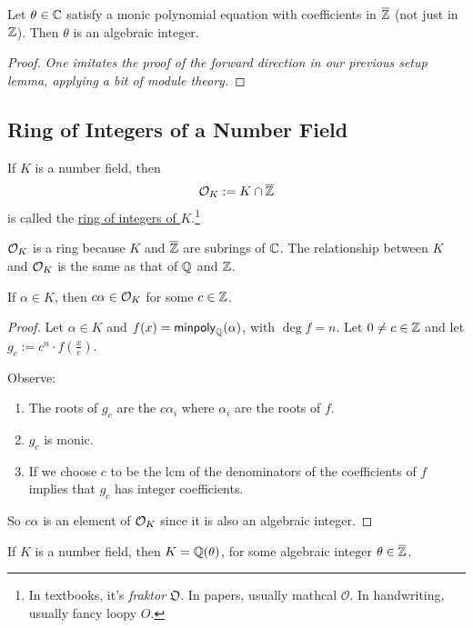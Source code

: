 \begin{theorem}
    Let $\theta\in\mathbb C$ satisfy a monic polynomial equation with coefficients in $\overline{\mathbb Z}$ (not just in $\mathbb Z$). Then $\theta$ is an algebraic integer.
\end{theorem}
\begin{proof}
    \emph{One imitates the proof of the forward direction in our previous setup lemma, applying a bit of module theory.}
\end{proof}

\subsection{Ring of Integers of a Number Field}
\begin{definition}
    If $K$ is a number field, then
    \[\mathcal{O}_K := K\cap \overline{\mathbb Z}\]
    is called the \ul{ring of integers of $K$}.\footnote{In textbooks, it's \emph{fraktor} $\mathfrak{O}$. In papers, usually mathcal $\mathcal{O}$. In handwriting, usually fancy loopy $O$.}
\end{definition}
$\mathcal{O}_K$ is a ring because $K$ and $\overline{\mathbb Z}$ are subrings of $\mathbb C$. The relationship between $K$ and $\mathcal{O}_K$ is the same as that of $\mathbb Q$ and $\mathbb Z$.

\begin{lemma}
    If $\alpha\in K$, then $c\alpha\in \mathcal{O}_K$ for some $c\in\mathbb Z$.
\end{lemma}
\begin{proof}
    Let $\alpha\in K$ and $f(x) = \operatorname{\mathsf{minpoly}}_\mathbb Q(\alpha)$, with $\deg f = n$. Let $0\neq c\in \mathbb Z$ and let $g_c := c^n\cdot f\left( \frac{x}{c} \right)$.

    Observe:
    \begin{enumerate}[1)]
        \item The roots of $g_c$ are the $c\alpha_i$ where $\alpha_i$ are the roots of $f$.
        \item $g_c$ is monic.
        \item If we choose $c$ to be the lcm of the denominators of the coefficients of $f$ implies that $g_c$ has integer coefficients.
    \end{enumerate}
    So $c\alpha$ is an element of $\mathcal{O}_K$ since it is also an algebraic integer.
\end{proof}

\begin{corollary}
    If $K$ is a number field, then $K = \mathbb Q(\theta)$, for some algebraic integer $\theta\in\overline{\mathbb Z}$.
\end{corollary}

